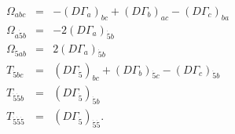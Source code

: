 \begin{equation}
\begin{array}{ccc}
  \Omega_{abc}  & = & -(D\Gamma_a)_{bc} + (D\Gamma_b)_{ac} - (D\Gamma_c)_{ba} \\
  \Omega_{a{\dot 5}b} & = & - 2 (D\Gamma_a)_{{\dot 5} b} \\
  \Omega_{{\dot 5}ab} & = & 2 (D\Gamma_a)_{{\dot 5} b} \\
  T_{{\dot 5}bc} & = & (D\Gamma_{\dot 5})_{bc} + (D\Gamma_b)_{{\dot 5} c} - (D\Gamma_c)_{{\dot 5} b} \\
  T_{{\dot 5}{\dot 5}b} & = & (D\Gamma_{\dot 5})_{{\dot 5}b} \\
  T_{{\dot 5}{\dot 5}{\dot 5}} & = & (D\Gamma_{\dot 5})_{{\dot
  5}{\dot 5}}.
\end{array}
\end{equation}

